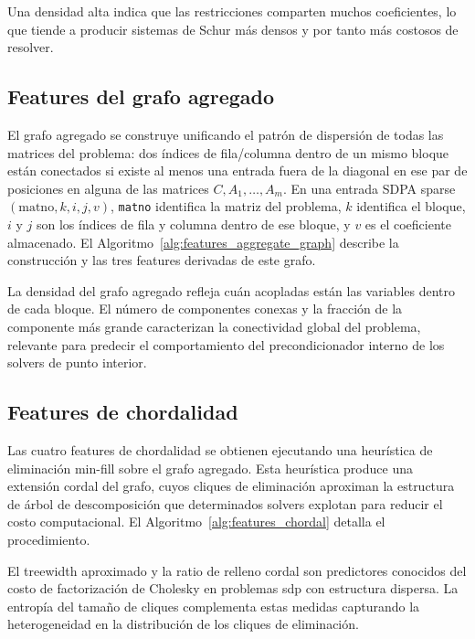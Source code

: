 

Una densidad alta indica que las restricciones comparten muchos coeficientes, lo que
tiende a producir sistemas de Schur más densos y por tanto más costosos de resolver.

\newpage
\subsection{Features del grafo agregado}
\label{subsec:avance_features_aggregate}

El grafo agregado se construye unificando el patrón de dispersión de todas las
matrices del problema: dos índices de fila/columna dentro de un mismo bloque están
conectados si existe al menos una entrada fuera de la diagonal en ese par de posiciones
en alguna de las matrices $C, A_1, \dots, A_m$.
En una entrada SDPA sparse $(\text{matno},k,i,j,v)$, \texttt{matno} identifica la
matriz del problema, $k$ identifica el bloque, $i$ y $j$ son los índices de fila y
columna dentro de ese bloque, y $v$ es el coeficiente almacenado.
El Algoritmo~\ref{alg:features_aggregate_graph} describe la construcción y las tres
features derivadas de este grafo.



La densidad del grafo agregado refleja cuán acopladas están las variables dentro de
cada bloque.
El número de componentes conexas y la fracción de la componente más grande
caracterizan la conectividad global del problema, relevante para predecir el
comportamiento del precondicionador interno de los solvers de punto interior.

\newpage
\subsection{Features de chordalidad}
\label{subsec:avance_features_chordal}

Las cuatro features de chordalidad se obtienen ejecutando una heurística de
eliminación min-fill sobre el grafo agregado.
Esta heurística produce una extensión cordal del grafo, cuyos cliques de eliminación
aproximan la estructura de árbol de descomposición que determinados solvers explotan
para reducir el costo computacional.
El Algoritmo~\ref{alg:features_chordal} detalla el procedimiento.



El treewidth aproximado y la ratio de relleno cordal son predictores conocidos del
costo de factorización de Cholesky en problemas \acrshort{sdp} con estructura
dispersa.
La entropía del tamaño de cliques complementa estas medidas capturando la
heterogeneidad en la distribución de los cliques de eliminación.

